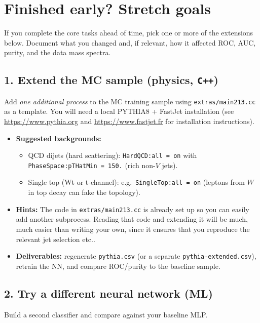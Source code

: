 \documentclass[11pt]{article}
\begin{document}
\section*{Finished early? Stretch goals}

If you complete the core tasks ahead of time, pick one or more of the extensions below. Document what you changed and, if relevant, how it affected ROC, AUC, purity, and the data mass spectra.

\subsection*{1. Extend the MC sample (physics, \texttt{C++})}
Add \emph{one additional process} to the MC training sample using \texttt{extras/main213.cc} as a template. You will need a local PYTHIA8 + FastJet installation (see \url{https://www.pythia.org} and \url{https://www.fastjet.fr} for installation instructions).

\begin{itemize}
  \item \textbf{Suggested backgrounds:}
    \begin{itemize}
      \item QCD dijets (hard scattering): \verb|HardQCD:all = on| with \verb|PhaseSpace:pTHatMin = 150.| (rich non-$V$ jets).
      \item Single top (Wt or t-channel): e.g.\ \verb|SingleTop:all = on| (leptons from $W$ in top decay can fake the topology).
    \end{itemize}
  \item \textbf{Hints:} The code in \texttt{extras/main213.cc} is already set up so you can easily add another subprocess. Reading that code and extending it will be much, much easier than writing your own, since it ensures that you reproduce the relevant jet selection etc..
  \item \textbf{Deliverables:} regenerate \texttt{pythia.csv} (or a separate \texttt{pythia-extended.csv}), retrain the NN, and compare ROC/purity to the baseline sample.
\end{itemize}

\subsection*{2. Try a different neural network (ML)}
Build a second classifier and compare against your baseline MLP.
\end{document}
